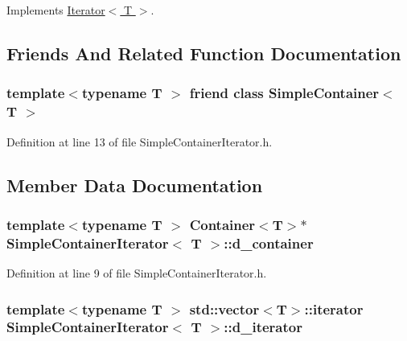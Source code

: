 Implements \hyperlink{class_iterator_a94a7b0c50676cd9ee924eddece41d8d4}{Iterator$<$ T $>$}.



\subsection{Friends And Related Function Documentation}
\hypertarget{class_simple_container_iterator_af3eda3b215741021fb668d573cf344f3}{
\subsubsection[{SimpleContainer$<$ T $>$}]{\setlength{\rightskip}{0pt plus 5cm}template$<$typename T $>$ friend class {\bf SimpleContainer}$<$ T $>$}}
\label{class_simple_container_iterator_af3eda3b215741021fb668d573cf344f3}


Definition at line 13 of file SimpleContainerIterator.h.



\subsection{Member Data Documentation}
\hypertarget{class_simple_container_iterator_a179c3b6ee590cd5476d6dee1c7b9a90e}{
\subsubsection[{d\_\-container}]{\setlength{\rightskip}{0pt plus 5cm}template$<$typename T $>$ {\bf Container}$<$T$>$$\ast$ {\bf SimpleContainerIterator}$<$ T $>$::{\bf d\_\-container}}}
\label{class_simple_container_iterator_a179c3b6ee590cd5476d6dee1c7b9a90e}


Definition at line 9 of file SimpleContainerIterator.h.

\hypertarget{class_simple_container_iterator_ad5523f803739cceb9f42701bca99aef5}{
\subsubsection[{d\_\-iterator}]{\setlength{\rightskip}{0pt plus 5cm}template$<$typename T $>$ std::vector$<$T$>$::iterator {\bf SimpleContainerIterator}$<$ T $>$::{\bf d\_\-iterator}}}
\label{class_simple_container_iterator_ad5523f803739cceb9f42701bca99aef5}


